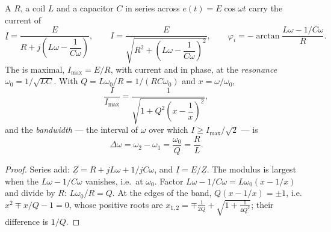 \begin{theorem}\label{thm:b1:sinusoidal-impedance:resonance}
A  $R$, a coil $L$ and a capacitor $C$ in series across
$e(t) = E\cos\omega t$ carry the current of 
\[
\underline I = \frac{E}{R + j\left(L\omega - \dfrac{1}{C\omega}\right)},
\qquad
I = \frac{E}{\sqrt{R^2 + \left(L\omega - \dfrac{1}{C\omega}\right)^2}},
\qquad
\varphi_i = -\arctan\frac{L\omega - 1/C\omega}{R} .
\]
The  is maximal, $I_{\max} = E/R$, with current and  in
phase, at the \emph{resonance} $\omega_0 = 1/\sqrt{LC}$. With
$Q = L\omega_0/R = 1/(RC\omega_0)$ and $x = \omega/\omega_0$,
\[
\frac{I}{I_{\max}} = \frac{1}{\sqrt{1 + Q^2\left(x - \dfrac1x\right)^2}} ,
\]
and the \emph{bandwidth} --- the interval of $\omega$ over which
$I \geq I_{\max}/\sqrt2$ --- is
\[
\Delta\omega = \omega_2 - \omega_1 = \frac{\omega_0}{Q} = \frac{R}{L} .
\]
\end{theorem}

\begin{proof}
Series  add: $\underline Z = R + jL\omega + 1/jC\omega$, and
$\underline I = \underline E/\underline Z$. The modulus is largest when
the  $L\omega - 1/C\omega$ vanishes, i.e.\ at $\omega_0$.
Factor $L\omega - 1/C\omega = L\omega_0(x - 1/x)$ and divide by $R$:
$L\omega_0/R = Q$. At the edges of the band, $Q(x - 1/x) = \pm 1$, i.e.\
$x^2 \mp x/Q - 1 = 0$, whose positive roots are $x_{1,2} = \mp\frac{1}{2Q}
+ \sqrt{1 + \frac{1}{4Q^2}}$; their difference is $1/Q$.
\end{proof}

